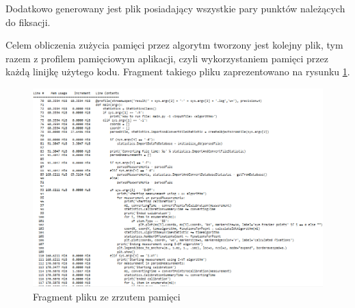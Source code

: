 Dodatkowo generowany jest plik posiadający wszystkie pary punktów należących do fiksacji.\par
Celem obliczenia zużycia pamięci przez algorytm tworzony jest kolejny plik, tym razem z profilem pamięciowym aplikacji, czyli wykorzystaniem pamięci przez każdą linijkę użytego kodu. Fragment takiego pliku zaprezentowano na rysunku \ref{fig:memoryfile}.
\begin{figure}[H]
        \centering
        \captionsetup{justification=centering,margin=2cm}
        \includegraphics[width=\linewidth]{resources/memory_file.png}
        \caption{Fragment pliku ze zrzutem pamięci}
        \label{fig:memoryfile}
\end{figure}
